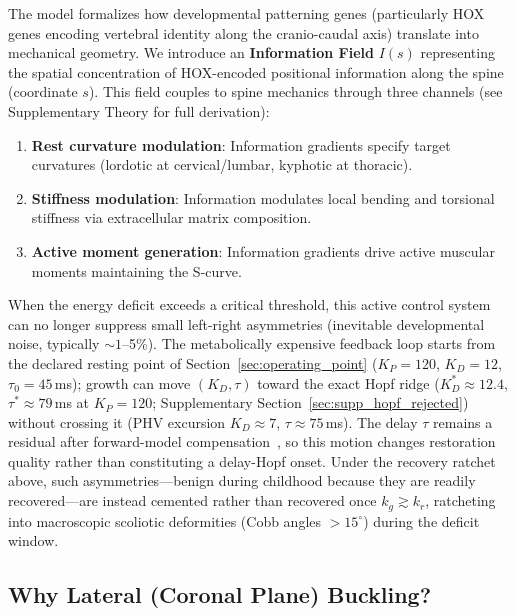 The model formalizes how developmental patterning genes (particularly HOX genes encoding vertebral identity along the cranio-caudal axis) translate into mechanical geometry. We introduce an \textbf{Information Field} $I(s)$ representing the spatial concentration of HOX-encoded positional information along the spine (coordinate $s$). This field couples to spine mechanics through three channels (see Supplementary Theory for full derivation):

\begin{enumerate}
\item \textbf{Rest curvature modulation}: Information gradients specify target curvatures (lordotic at cervical/lumbar, kyphotic at thoracic).
\item \textbf{Stiffness modulation}: Information modulates local bending and torsional stiffness via extracellular matrix composition.
\item \textbf{Active moment generation}: Information gradients drive active muscular moments maintaining the S-curve.
\end{enumerate}

When the energy deficit exceeds a critical threshold, this active control system can no longer suppress small left-right asymmetries (inevitable developmental noise, typically $\sim 1$--5\%). The metabolically expensive feedback loop starts from the declared resting point of Section~\ref{sec:operating_point} ($K_P = 120$, $K_D = 12$, $\tau_0 = 45$\,ms); growth can move $(K_D,\tau)$ toward the exact Hopf ridge ($K_D^*\approx 12.4$, $\tau^*\approx 79$\,ms at $K_P=120$; Supplementary Section~\ref{sec:supp_hopf_rejected}) without crossing it (PHV excursion $K_D \approx 7$, $\tau \approx 75$\,ms). The delay $\tau$ remains a residual after forward-model compensation~\cite{wolpert1998internal}, so this motion changes restoration quality rather than constituting a delay-Hopf onset. Under the recovery ratchet above, such asymmetries---benign during childhood because they are readily recovered---are instead cemented rather than recovered once $k_g \gtrsim k_r$, ratcheting into macroscopic scoliotic deformities (Cobb angles $> 15^{\circ}$) during the deficit window.

\subsection{Why Lateral (Coronal Plane) Buckling?}

